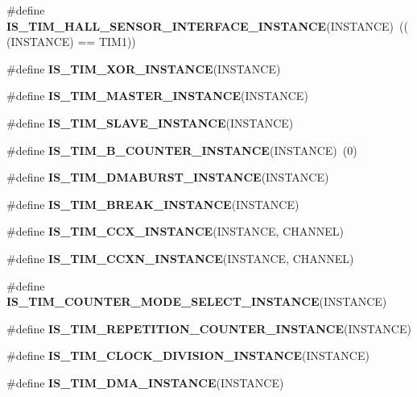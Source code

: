 \begin{DoxyCompactItemize}
\mbox{\label{group___exported__macro_ga979ea18ba0931f5ed15cc2f3ac84794b}} 
\#define {\bfseries I\+S\+\_\+\+T\+I\+M\+\_\+\+H\+A\+L\+L\+\_\+\+S\+E\+N\+S\+O\+R\+\_\+\+I\+N\+T\+E\+R\+F\+A\+C\+E\+\_\+\+I\+N\+S\+T\+A\+N\+CE}(I\+N\+S\+T\+A\+N\+CE)~(((I\+N\+S\+T\+A\+N\+CE) == T\+I\+M1))
\item 
\#define {\bfseries I\+S\+\_\+\+T\+I\+M\+\_\+\+X\+O\+R\+\_\+\+I\+N\+S\+T\+A\+N\+CE}(I\+N\+S\+T\+A\+N\+CE)
\item 
\#define {\bfseries I\+S\+\_\+\+T\+I\+M\+\_\+\+M\+A\+S\+T\+E\+R\+\_\+\+I\+N\+S\+T\+A\+N\+CE}(I\+N\+S\+T\+A\+N\+CE)
\item 
\#define {\bfseries I\+S\+\_\+\+T\+I\+M\+\_\+\+S\+L\+A\+V\+E\+\_\+\+I\+N\+S\+T\+A\+N\+CE}(I\+N\+S\+T\+A\+N\+CE)
\item 
\mbox{\label{group___exported__macro_gac41867bf288927ff8ff10a85e67a591b}} 
\#define {\bfseries I\+S\+\_\+\+T\+I\+M\+\_\+B\+\_\+\+C\+O\+U\+N\+T\+E\+R\+\_\+\+I\+N\+S\+T\+A\+N\+CE}(I\+N\+S\+T\+A\+N\+CE)~(0)
\item 
\#define {\bfseries I\+S\+\_\+\+T\+I\+M\+\_\+\+D\+M\+A\+B\+U\+R\+S\+T\+\_\+\+I\+N\+S\+T\+A\+N\+CE}(I\+N\+S\+T\+A\+N\+CE)
\item 
\#define {\bfseries I\+S\+\_\+\+T\+I\+M\+\_\+\+B\+R\+E\+A\+K\+\_\+\+I\+N\+S\+T\+A\+N\+CE}(I\+N\+S\+T\+A\+N\+CE)
\item 
\#define {\bfseries I\+S\+\_\+\+T\+I\+M\+\_\+\+C\+C\+X\+\_\+\+I\+N\+S\+T\+A\+N\+CE}(I\+N\+S\+T\+A\+N\+CE,  C\+H\+A\+N\+N\+EL)
\item 
\#define {\bfseries I\+S\+\_\+\+T\+I\+M\+\_\+\+C\+C\+X\+N\+\_\+\+I\+N\+S\+T\+A\+N\+CE}(I\+N\+S\+T\+A\+N\+CE,  C\+H\+A\+N\+N\+EL)
\item 
\#define {\bfseries I\+S\+\_\+\+T\+I\+M\+\_\+\+C\+O\+U\+N\+T\+E\+R\+\_\+\+M\+O\+D\+E\+\_\+\+S\+E\+L\+E\+C\+T\+\_\+\+I\+N\+S\+T\+A\+N\+CE}(I\+N\+S\+T\+A\+N\+CE)
\item 
\#define {\bfseries I\+S\+\_\+\+T\+I\+M\+\_\+\+R\+E\+P\+E\+T\+I\+T\+I\+O\+N\+\_\+\+C\+O\+U\+N\+T\+E\+R\+\_\+\+I\+N\+S\+T\+A\+N\+CE}(I\+N\+S\+T\+A\+N\+CE)
\item 
\#define {\bfseries I\+S\+\_\+\+T\+I\+M\+\_\+\+C\+L\+O\+C\+K\+\_\+\+D\+I\+V\+I\+S\+I\+O\+N\+\_\+\+I\+N\+S\+T\+A\+N\+CE}(I\+N\+S\+T\+A\+N\+CE)
\item 
\#define {\bfseries I\+S\+\_\+\+T\+I\+M\+\_\+\+D\+M\+A\+\_\+\+I\+N\+S\+T\+A\+N\+CE}(I\+N\+S\+T\+A\+N\+CE)
\item 

\end{DoxyCompactItemize}
